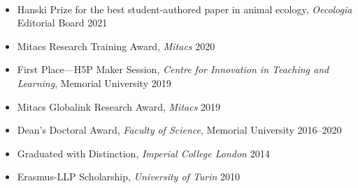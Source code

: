 \\



\begin{itemize}
  \item Hanski Prize for the best student-authored paper in animal ecology, \emph{Oecologia} Editorial Board \hfill 2021
  \item Mitacs Research Training Award, \emph{Mitacs} \hfill 2020
  \item First Place---H5P Maker Session, \emph{Centre for Innovation in Teaching and Learning}, Memorial University \hfill 2019
  \item Mitacs Globalink Research Award, \emph{Mitacs} \hfill 2019
  \item Dean's Doctoral Award, \emph{Faculty of Science}, Memorial University \hfill 2016--2020
  \item Graduated with Distinction, \emph{Imperial College London} \hfill 2014
  \item Erasmus-LLP Scholarship, \emph{University of Turin} \hfill 2010
\end{itemize}
